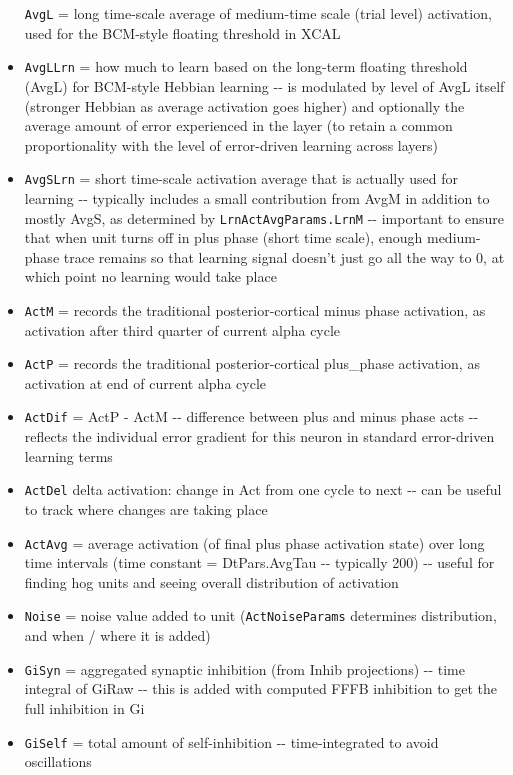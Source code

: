 \begin{itemize}
  \texttt{AvgL} = long time-scale average of medium-time scale (trial
  level) activation, used for the BCM-style floating threshold in XCAL
\item
  \texttt{AvgLLrn} = how much to learn based on the long-term floating
  threshold (AvgL) for BCM-style Hebbian learning -\/- is modulated by
  level of AvgL itself (stronger Hebbian as average activation goes
  higher) and optionally the average amount of error experienced in the
  layer (to retain a common proportionality with the level of
  error-driven learning across layers)
\item
  \texttt{AvgSLrn} = short time-scale activation average that is
  actually used for learning -\/- typically includes a small
  contribution from AvgM in addition to mostly AvgS, as determined by
  \texttt{LrnActAvgParams.LrnM} -\/- important to ensure that when unit
  turns off in plus phase (short time scale), enough medium-phase trace
  remains so that learning signal doesn't just go all the way to 0, at
  which point no learning would take place
\item
  \texttt{ActM} = records the traditional posterior-cortical minus phase
  activation, as activation after third quarter of current alpha cycle
\item
  \texttt{ActP} = records the traditional posterior-cortical plus\_phase
  activation, as activation at end of current alpha cycle
\item
  \texttt{ActDif} = ActP - ActM -\/- difference between plus and minus
  phase acts -\/- reflects the individual error gradient for this neuron
  in standard error-driven learning terms
\item
  \texttt{ActDel} delta activation: change in Act from one cycle to next
  -\/- can be useful to track where changes are taking place
\item
  \texttt{ActAvg} = average activation (of final plus phase activation
  state) over long time intervals (time constant = DtPars.AvgTau -\/-
  typically 200) -\/- useful for finding hog units and seeing overall
  distribution of activation
\item
  \texttt{Noise} = noise value added to unit (\texttt{ActNoiseParams}
  determines distribution, and when / where it is added)
\item
  \texttt{GiSyn} = aggregated synaptic inhibition (from Inhib
  projections) -\/- time integral of GiRaw -\/- this is added with
  computed FFFB inhibition to get the full inhibition in Gi
\item
  \texttt{GiSelf} = total amount of self-inhibition -\/- time-integrated
  to avoid oscillations
\end{itemize}

